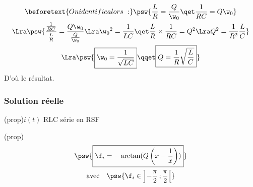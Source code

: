 \documentclass[../../main/main.tex]{subfiles}
\begin{document}
\begin{tcb*}[breakable]
\begin{isd}[righthand ratio=.30]
\begin{center}
{			}
			\vspace{-15pt}
		\end{center}
	\end{isd}
	\vspace{-15pt}
	\begin{gather*}
		\beforetext{On identifie alors~:}
		\psw{
			\frac{L}{R} = \frac{Q}{\w_0}
			\qet
			\frac{1}{RC} = Q\w_0
		}
		\\\Lra
		\psw{%
			\frac{\frac{1}{RC}}{\frac{L}{R}} =
			\frac{Q\w_0}{\frac{Q}{\w_0}}
			\Lra
			\w_0{}^2 = \frac{1}{LC}
			\qet
			\frac{L}{R} \times \frac{1}{RC} = Q^2
			\Lra
			Q^2 = \frac{1}{R^2} \frac{L}{C}
		}
		\\\Lra
		\psw{%
			\boxed{\w_0 = \frac{1}{\sqrt{LC}}}
			\qqet
			\boxed{Q = \frac{1}{R}\sqrt{\frac{L}{C}}}
		}
	\end{gather*}
	D'où le résultat.
	\hqed
\end{tcb*}

\subsubsection{Solution réelle}

\begin{tcb}(prop){$i(t)$ RLC série en RSF}
	\smallbreak
	\begin{isd}[interior hidden, sidebyside align=top](prop)
		\psw{%
			\[
				\boxed{
					I(x)
					= \abs{\Iu}
					= \frac{E_0/R}{\sqrt{1 + Q^2\left( x - \dfrac{1}{x} \right)^2}}
				}
			\]
		}%
		\vspace{-15pt}
		\tcblower
		\vspace{-15pt}
		\begin{gather*}
			\psw{%
				\boxed{\f_i = - \arctan(Q \left( x - \frac{1}{x} \right))}
			}%
			\\\text{avec}
			\quad
			\psw{%
			\f_i \in \left] -\frac{\pi}{2}\,; \frac{\pi}{2} \right[
			}%
		\end{gather*}
		\vspace{-15pt}
	\end{isd}
\end{tcb}
\end{document}
